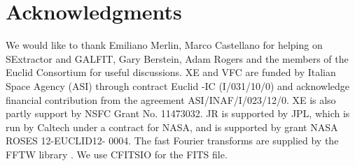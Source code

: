 \documentclass[useAMS,usenatbib]{mnras}
\begin{document}
\section*{Acknowledgments}

We would like to thank Emiliano Merlin, Marco Castellano for helping
on {\sc SExtractor} and {\sc GALFIT}, Gary Berstein, Adam Rogers and
the members of the Euclid Consortium for useful discussions.  XE and VFC 
are funded by Italian Space Agency (ASI) through contract Euclid -IC (I/031/10/0) and 
acknowledge financial contribution from the agreement ASI/INAF/I/023/12/0. XE is also partly
support by NSFC Grant No. 11473032. JR is supported by JPL, which is
run by Caltech under a contract for NASA, and is supported by grant
NASA ROSES 12-EUCLID12- 0004. The fast Fourier transforms are supplied
by the FFTW library \citep{fftw05}. We use CFITSIO
\citep{1999ASPC..172..487P} for the FITS file.



\end{document}
